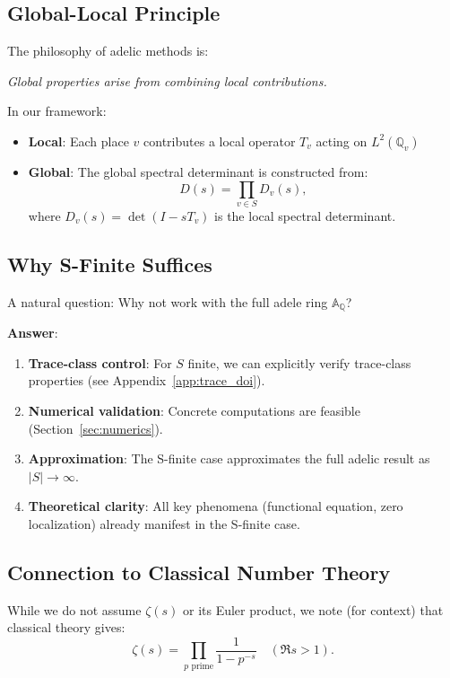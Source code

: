 \subsection{Global-Local Principle}

The philosophy of adelic methods is:
\begin{center}
\emph{Global properties arise from combining local contributions.}
\end{center}

In our framework:
\begin{itemize}
\item \textbf{Local}: Each place $v$ contributes a local operator $T_v$ acting on $L^2(\mathbb{Q}_v)$
\item \textbf{Global}: The global spectral determinant is constructed from:
\[
D(s) = \prod_{v \in S} D_v(s),
\]
where $D_v(s) = \det(I - s T_v)$ is the local spectral determinant.
\end{itemize}

\subsection{Why S-Finite Suffices}

A natural question: Why not work with the full adele ring $\mathbb{A}_\mathbb{Q}$?

\textbf{Answer}: 
\begin{enumerate}
\item \textbf{Trace-class control}: For $S$ finite, we can explicitly verify trace-class properties (see Appendix~\ref{app:trace_doi}).
\item \textbf{Numerical validation}: Concrete computations are feasible (Section~\ref{sec:numerics}).
\item \textbf{Approximation}: The S-finite case approximates the full adelic result as $|S| \to \infty$.
\item \textbf{Theoretical clarity}: All key phenomena (functional equation, zero localization) already manifest in the S-finite case.
\end{enumerate}

\subsection{Connection to Classical Number Theory}

While we do not assume $\zeta(s)$ or its Euler product, we note (for context) that classical theory gives:
\[
\zeta(s) = \prod_{p \text{ prime}} \frac{1}{1 - p^{-s}} \quad (\Re s > 1).
\]

